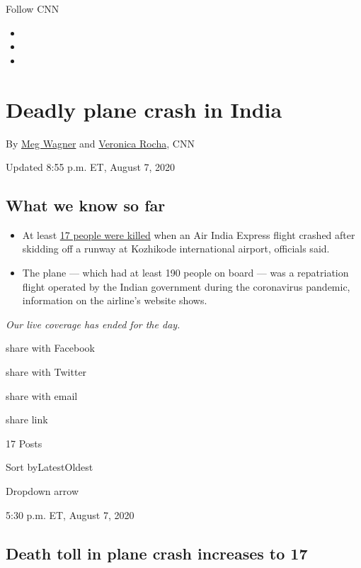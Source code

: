 Follow CNN

\begin{itemize}
\item
\item
\item
\end{itemize}

\hypertarget{deadly-plane-crash-in-india}{%
\section{Deadly plane crash in
India}\label{deadly-plane-crash-in-india}}

By \href{/profiles/meg-wagner}{Meg Wagner} and
\href{/profiles/veronica-rocha}{Veronica Rocha}, CNN

Updated 8:55 p.m. ET, August 7, 2020

\hypertarget{what-we-know-so-far}{%
\subsection{What we know so far}\label{what-we-know-so-far}}

\begin{itemize}
\tightlist
\item
  At least
  \href{https://www.cnn.com/2020/08/07/asia/plane-crash-calicut-india-intl/index.html}{17
  people were killed} when an Air India Express flight crashed after
  skidding off a runway at Kozhikode international airport, officials
  said.
\item
  The plane --- which had at least 190 people on board --- was a
  repatriation flight operated by the Indian government during the
  coronavirus pandemic, information on the airline's website shows.
\end{itemize}

\emph{Our live coverage has ended for the day.}

share with Facebook

share with Twitter

share with email

share link

17 Posts

Sort byLatestOldest

Dropdown arrow

5:30 p.m. ET, August 7, 2020

\hypertarget{death-toll-in-plane-crash-increases-to-17}{%
\subsection{Death toll in plane crash increases to
17}\label{death-toll-in-plane-crash-increases-to-17}}

